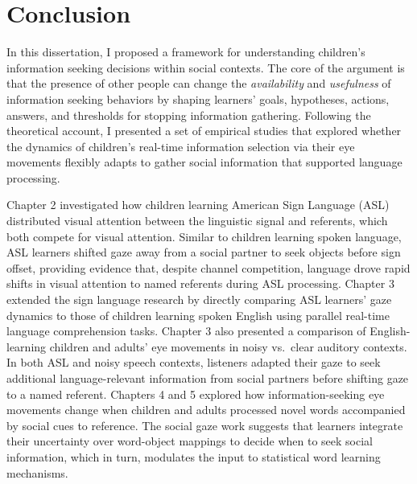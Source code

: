\documentclass[oneside]{report}
\begin{document}
\newpage

\chapter*{Conclusion}\label{conclusion}

In this dissertation, I proposed a framework for understanding
children's information seeking decisions within social contexts. The
core of the argument is that the presence of other people can change the
\emph{availability} and \emph{usefulness} of information seeking
behaviors by shaping learners' goals, hypotheses, actions, answers, and
thresholds for stopping information gathering. Following the theoretical
account, I presented a set of empirical studies that explored whether
the dynamics of children's real-time information selection via their eye
movements flexibly adapts to gather social information that supported
language processing.

Chapter 2 investigated how children learning American Sign Language
(ASL) distributed visual attention between the linguistic signal and
referents, which both compete for visual attention. Similar to children
learning spoken language, ASL learners shifted gaze away from a social
partner to seek objects before sign offset, providing evidence that,
despite channel competition, language drove rapid shifts in visual
attention to named referents during ASL processing. Chapter 3 extended
the sign language research by directly comparing ASL learners' gaze
dynamics to those of children learning spoken English using parallel
real-time language comprehension tasks. Chapter 3 also presented a
comparison of English-learning children and adults' eye movements in
noisy vs.~clear auditory contexts. In both ASL and noisy speech
contexts, listeners adapted their gaze to seek additional
language-relevant information from social partners before shifting gaze
to a named referent. Chapters 4 and 5 explored how information-seeking
eye movements change when children and adults processed novel words
accompanied by social cues to reference. The social gaze work suggests
that learners integrate their uncertainty over word-object mappings to
decide when to seek social information, which in turn, modulates the
input to statistical word learning mechanisms.
\end{document}
